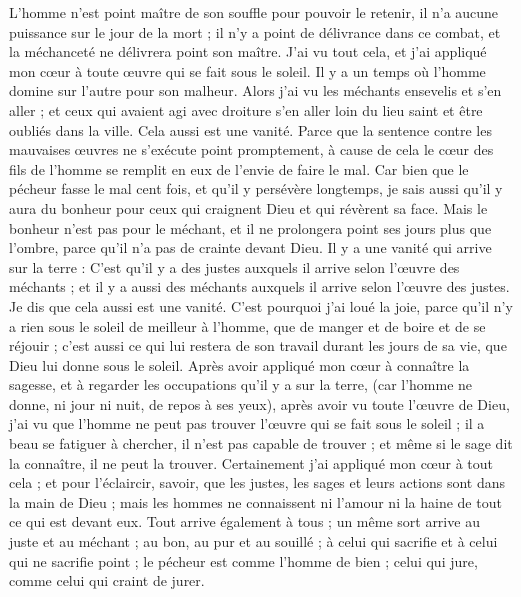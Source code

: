 \begin{multicols}{2}
L'homme n'est point maître de son souffle pour pouvoir le retenir, il n'a aucune puissance sur le jour de la mort ; il n'y a point de délivrance dans ce combat, et la méchanceté ne délivrera point son maître.
J'ai vu tout cela, et j'ai appliqué mon cœur à toute œuvre qui se fait sous le soleil. Il y a un temps où l'homme domine sur l'autre pour son malheur.
Alors j'ai vu les méchants ensevelis et s'en aller ; et ceux qui avaient agi avec droiture s'en aller loin du lieu saint et être oubliés dans la ville. Cela aussi est une vanité.
Parce que la sentence contre les mauvaises œuvres ne s'exécute point promptement, à cause de cela le cœur des fils de l'homme se remplit en eux de l'envie de faire le mal.
Car bien que le pécheur fasse le mal cent fois, et qu'il y persévère longtemps, je sais aussi qu'il y aura du bonheur pour ceux qui craignent Dieu et qui révèrent sa face.
Mais le bonheur n'est pas pour le méchant, et il ne prolongera point ses jours plus que l'ombre, parce qu'il n'a pas de crainte devant Dieu.
Il y a une vanité qui arrive sur la terre : C'est qu'il y a des justes auxquels il arrive selon l'œuvre des méchants ; et il y a aussi des méchants auxquels il arrive selon l'œuvre des justes. Je dis que cela aussi est une vanité.
C'est pourquoi j'ai loué la joie, parce qu'il n'y a rien sous le soleil de meilleur à l'homme, que de manger et de boire et de se réjouir ; c'est aussi ce qui lui restera de son travail durant les jours de sa vie, que Dieu lui donne sous le soleil. 
Après avoir appliqué mon cœur à connaître la sagesse, et à regarder les occupations qu'il y a sur la terre, (car l'homme ne donne, ni jour ni nuit, de repos à ses yeux), 
après avoir vu toute l'œuvre de Dieu, j'ai vu que l'homme ne peut pas trouver l'œuvre qui se fait sous le soleil ; il a beau se fatiguer à chercher, il n'est pas capable de trouver ; et même si le sage dit la connaître, il ne peut la trouver.
\VerseOne{}Certainement j'ai appliqué mon cœur à tout cela ; et pour l'éclaircir, savoir, que les justes, les sages et leurs actions sont dans la main de Dieu ; mais les hommes ne connaissent ni l'amour ni la haine de tout ce qui est devant eux. 
Tout arrive également à tous ; un même sort arrive au juste et au méchant ; au bon, au pur et au souillé ; à celui qui sacrifie et à celui qui ne sacrifie point ; le pécheur est comme l'homme de bien ; celui qui jure, comme celui qui craint de jurer. 

\end{multicols}
